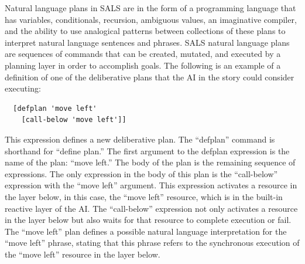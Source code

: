 Natural language plans in SALS are in the form of a programming
language that has variables, conditionals, recursion, ambiguous
values, an imaginative compiler, and the ability to use analogical
patterns between collections of these plans to interpret natural
language sentences and phrases.  SALS natural language plans are
sequences of commands that can be created, mutated, and executed by a
planning layer in order to accomplish goals.  The following is an
example of a definition of one of the deliberative plans that the AI
in the story could consider executing:
\begin{samepage}
\begin{Verbatim}
  [defplan 'move left'
    [call-below 'move left']]
\end{Verbatim}
\end{samepage}
This expression defines a new deliberative plan.  The ``defplan''
command is shorthand for ``define plan.''  The first argument to the
defplan expression is the name of the plan: ``move left.''  The body
of the plan is the remaining sequence of expressions.  The only
expression in the body of this plan is the ``call-below'' expression
with the ``move left'' argument.  This expression activates a resource
in the layer below, in this case, the ``move left'' resource, which is
in the built-in reactive layer of the AI.  The ``call-below''
expression not only activates a resource in the layer below but also
waits for that resource to complete execution or fail.  The ``move
left'' plan defines a possible natural language interpretation for the
``move left'' phrase, stating that this phrase refers to the
synchronous execution of the ``move left'' resource in the layer
below.

